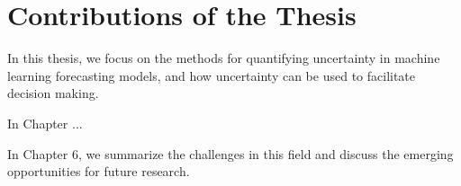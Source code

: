 \section{Contributions of the Thesis}

In this thesis, we focus on the methods for quantifying uncertainty in machine learning forecasting models, and how uncertainty can be used to facilitate decision making.

In Chapter ...

In Chapter 6, we summarize the challenges in this field and discuss the emerging opportunities for future research.